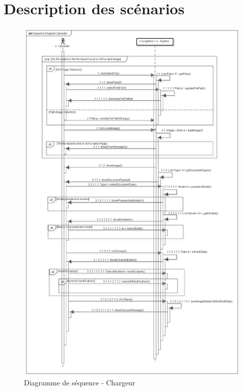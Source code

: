 \section{Description des scénarios}
\begin{figure}[h]
	\begin{center}
		\includegraphics[scale = 0.3]{img/seqDiagUploader.png}
	\end{center}
	\caption{Diagramme de séquence - Chargeur}
	\label{seqDiagUploader}
\end{figure}

